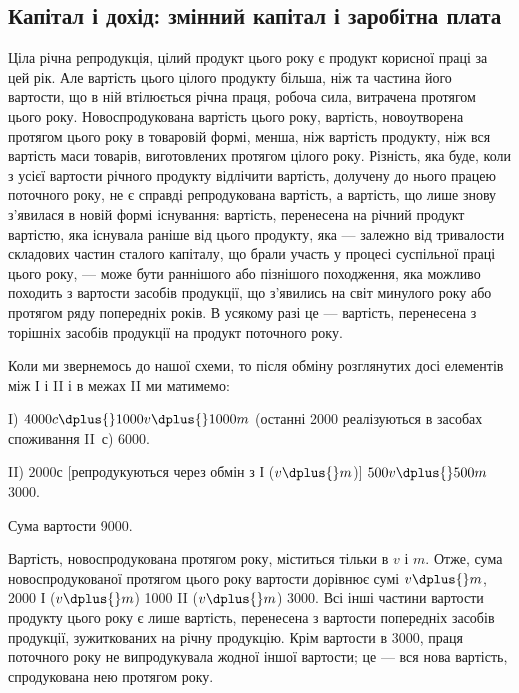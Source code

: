 
\subsection[Капітал і дохід: змінний капітал і заробітна плата]{Капітал і дохід: змінний капітал і заробітна плата\footnotemark{}}

\label{original-338}
Ціла
річна репродукція, цілий продукт цього року є продукт корисної
праці за цей рік. Але вартість цього цілого продукту більша, ніж
та частина його вартости, що в ній втілюється річна праця, робоча
сила, витрачена протягом цього року. Новоспродукована вартість
цього року, вартість, новоутворена протягом цього року в товаровій
формі, менша, ніж вартість продукту, ніж вся вартість маси товарів,
виготовлених протягом цілого року. Різність, яка буде, коли з усієї
вартости річного продукту відлічити вартість, долучену до нього працею
поточного року, не є справді репродукована вартість, а вартість, що лише
знову з’явилася в новій формі існування: вартість, перенесена на річний
продукт вартістю, яка існувала раніше від цього продукту, яка — залежно
від тривалости складових частин сталого капіталу, що брали участь у
процесі суспільної праці цього року, — може бути раннішого або пізнішого
походження, яка можливо походить з вартости засобів продукції,
що з’явились на світ минулого року або протягом ряду попередніх років.
В усякому разі це — вартість, перенесена з торішніх засобів продукції
на продукт поточного року.

Коли ми звернемось до нашої схеми, то після обміну розглянутих досі
елементів між І і II і в межах II ми матимемо:

I) $4000 c \dplus{} 1000 v \dplus{} 1000 m$ (останні 2000 реалізуються в засобах
споживання II~$с$) \deq{} 6000.

II) $2000 с$ [репродукуються через обмін з І ($v \dplus{} m$)] \dplus{} $500 v \dplus{} 500 m$ \deq{} 3000.

Сума вартости \deq{} 9000.

Вартість, новоспродукована протягом року, міститься тільки в $v$ і $m$.
Отже, сума новоспродукованої протягом цього року вартости дорівнює
сумі $v \dplus{} m$, \deq{} 2000 І ($v \dplus{} m$) \dplus{} 1000 II ($v \dplus{} m$) \deq{} 3000. Всі інші частини
вартости продукту цього року є лише вартість, перенесена з вартости
попередніх засобів продукції, зужиткованих на річну продукцію.
Крім вартости в 3000, праця поточного року не випродукувала жодної
іншої вартости; це — вся нова вартість, спродукована нею протягом року.


